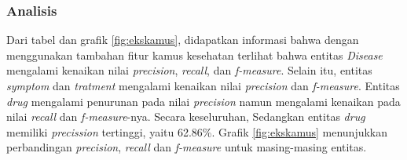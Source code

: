 	\subsubsection{Analisis}

	Dari tabel dan grafik \ref{fig:ekskamus}, didapatkan informasi bahwa dengan menggunakan tambahan fitur kamus kesehatan terlihat bahwa entitas \textit{Disease} mengalami kenaikan nilai \textit{precision}, \textit{recall}, dan \textit{f-measure}. Selain itu, entitas \textit{symptom} dan \textit{tratment} mengalami kenaikan nilai \textit{precision} dan \textit{f-measure}. Entitas \textit{drug} mengalami penurunan pada nilai \textit{precision} namun mengalami kenaikan pada nilai \textit{recall} dan \textit{f-measure}-nya. Secara keseluruhan,  Sedangkan entitas \textit{drug} memiliki \textit{precission} tertinggi, yaitu 62.86\%. Grafik \ref{fig:ekskamus} menunjukkan perbandingan \textit{precision}, \textit{recall} dan \textit{f-measure} untuk masing-masing entitas.
	
